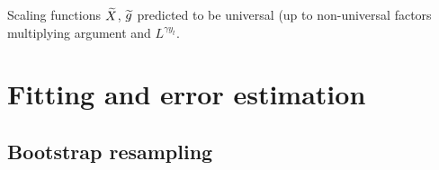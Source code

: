 Scaling functions $\widetilde{X}$, $\widetilde{g}$ predicted to be universal (up
to non-universal factors multiplying argument and $L^{\gamma y_t}$.

\section{Fitting and error estimation}

\subsection{Bootstrap resampling}
\label{sec:numerical-bootstrap}

\autocite{young2015everything}

